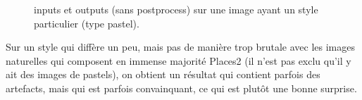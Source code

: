 \documentclass[12pt]{article}
\begin{document}
\begin{figure}[htb]
  \hfill
  \hfill
  \caption{inputs et outputs (sans postprocess) sur une image ayant un style particulier (type pastel).}\label{fig:occlus_dynamic}
\end{figure}

Sur un style qui diffère un peu, mais pas de manière trop brutale avec les images naturelles qui composent en immense majorité Places2 (il n'est pas exclu qu'il y ait des images de pastels), on obtient un résultat qui contient parfois des artefacts, mais qui est parfois convainquant, ce qui est plutôt une bonne surprise.
\end{document}
